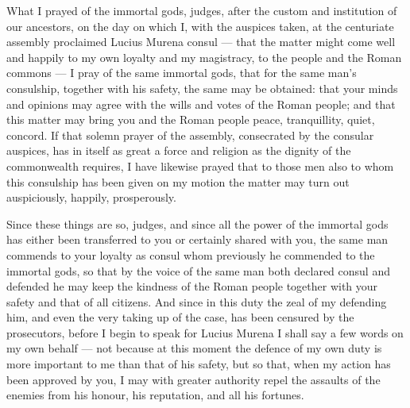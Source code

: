 
 What I prayed of the immortal gods, judges, after the custom and institution of our ancestors, on the day on which I, with the auspices taken, at the centuriate assembly proclaimed Lucius Murena consul --- that the matter might come well and happily to my own loyalty and my magistracy, to the people and the Roman commons --- I pray of the same immortal gods, that for the same man's consulship, together with his safety, the same may be obtained: that your minds and opinions may agree with the wills and votes of the Roman people; and that this matter may bring you and the Roman people peace, tranquillity, quiet, concord. If that solemn prayer of the assembly, consecrated by the consular auspices, has in itself as great a force and religion as the dignity of the commonwealth requires, I have likewise prayed that to those men also to whom this consulship has been given on my motion the matter may turn out auspiciously, happily, prosperously.

 Since these things are so, judges, and since all the power of the immortal gods has either been transferred to you or certainly shared with you, the same man commends to your loyalty as consul whom previously he commended to the immortal gods, so that by the voice of the same man both declared consul and defended he may keep the kindness of the Roman people together with your safety and that of all citizens. And since in this duty the zeal of my defending him, and even the very taking up of the case, has been censured by the prosecutors, before I begin to speak for Lucius Murena I shall say a few words on my own behalf --- not because at this moment the defence of my own duty is more important to me than that of his safety, but so that, when my action has been approved by you, I may with greater authority repel the assaults of the enemies from his honour, his reputation, and all his fortunes.

